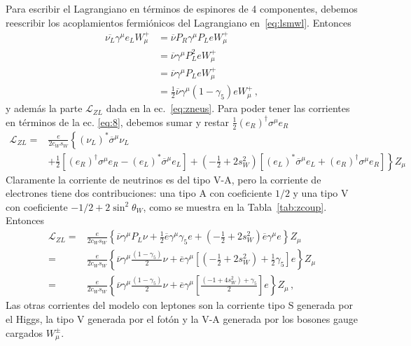 Para escribir el Lagrangiano en términos de espinores de 4 componentes, debemos reescribir los acoplamientos
fermiónicos del Lagrangiano en~\eqref{eq:lsmwl}. Entonces
\begin{align}
\label{eq:wf4}
  \overline{\nu_L}\gamma^\mu e_LW_\mu^+&=\overline{\nu}P_R\gamma^\mu P_LeW_\mu^+\nonumber\\
&=\overline{\nu}\gamma^\mu P_L^2eW_\mu^+\nonumber\\
&=\overline{\nu}\gamma^\mu P_LeW_\mu^+\nonumber\\
&=\frac{1}{2}\overline{\nu}\gamma^\mu(1-\gamma_5)eW_\mu^+\,,
\end{align}
y además la parte $\mathcal{L}_{ZL}$ dada en la ec.~\eqref{eq:zneus}. Para poder tener las corrientes en términos de la ec. \eqref{eq:8}, debemos sumar y restar
$\frac{1}{2}\left( e_R \right)^{\dagger}{\sigma}^\mu e_R $ 
\begin{align}
  \mathcal{L}_{ZL}
  =&\frac{e}{2c_W s_W} \left\{ \left( \nu_L \right)^{*}\overline{\sigma}^\mu \nu_L
     \phantom{\frac{1}{}2}\right. \nonumber\\
& \left. 
  +\frac{1}{2}\left[\left( e_R \right)^{\dagger}{\sigma}^\mu e_R-\left( e_L \right)^{*}\overline{\sigma}^\mu e_L
      \right]
      + \left( -\frac{1}{2} +2s_W^2 \right) \left[\left( e_L \right)^{*}\overline{\sigma}^\mu e_L+
    \left( e_R \right)^{\dagger}{\sigma}^\mu e_R    \right]  
     \right\}Z_\mu 
\end{align}
Claramente la corriente de neutrinos es del tipo $\text{V-A}$, pero la corriente
de electrones tiene dos contribuciones: una tipo $\text{A}$ con coeficiente $1/2$
y una tipo $\text{V}$ con coeficiente $-1/2+2\sin^2\theta_W$, como se muestra en la Tabla~\ref{tab:zcoup}.
Entonces
\begin{align}
    \mathcal{L}_{ZL}
  =&\frac{e}{2c_W s_W} \left\{ \overline{\nu}\gamma^{\mu}P_L\nu
       +\frac{1}{2} \overline{e} \gamma^{\mu} \gamma_5 e
      + \left( -\frac{1}{2} +2s_W^2 \right) \overline{e} \gamma^{\mu} e  
     \right\}Z_\mu \nonumber\\
  =&\frac{e}{2c_W s_W} \left\{
     \overline{\nu}\gamma^{\mu}\frac{\left( 1 -\gamma_5 \right)}{2}\nu
+ \overline{e} \gamma^{\mu} \left[ \left(- \frac{1}{2}+ 2s_W^2 \right) +\frac{1}{2}\gamma_5\right] e
     \right\}Z_\mu \nonumber\\
 =&\frac{e}{2c_W s_W} \left\{
     \overline{\nu}\gamma^{\mu}\frac{\left( 1 -\gamma_5 \right)}{2}\nu
+ \overline{e} \gamma^{\mu} \left[ \frac{\left( -1+4s_W^2 \right)+\gamma_5}{2}\right] e
     \right\}Z_\mu  \,,
\end{align}
Las otras corrientes del modelo con leptones son la corriente tipo $\text{S}$ generada por el Higgs, la tipo $\text{V}$ generada por el fotón
y la  $\text{V-A}$ generada por los bosones gauge cargados $W_{\mu}^{\pm}$.

